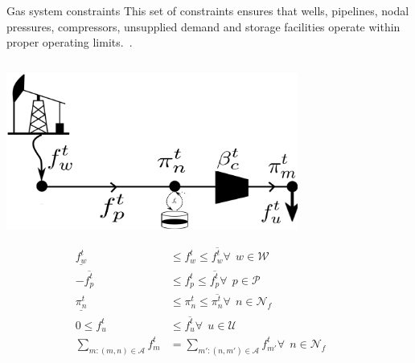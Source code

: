 \documentclass[hyperref={colorlinks,citecolor=blue,linkcolor=blue,urlcolor=blue}]{beamer}
\begin{document}
\begin{frame}{Gas system constraints}
\footnotesize
This set of constraints ensures that wells, pipelines, nodal pressures, compressors, unsupplied demand and storage facilities operate within proper operating limits.~\cite{MPNG}.

\begin{columns}
\begin{column}{0.45\textwidth}
    \includegraphics[width=0.75\textwidth]{figures/gas_dummy.png}

\begin{fleqn}[0pt] %
    \begin{subequations}
    \begin{align}
        \underline{f_{w}^t} & \leq f_{w}^t \leq \overline{f_{w}^t} \forall \ \ w \in \mathcal{W} \label{eq:well_limits} \\
        -\overline{f_{p}^t} & \leq f_{p}^t \leq \overline{f_{p}^t} \forall \ \ p \in \mathcal{P} \label{eq:pipe_limits} \\
        \underline{\pi_{n}^t} & \leq \pi_{n}^t \leq \overline{\pi_{n}^t} \forall \ \ n \in \mathcal{N}_f \label{eq:press_limit} \\
        0 \leq f_{u}^{t} & \leq \overline{f_{u}^{t}} \forall \ \ u \in \mathcal{U} \label{eq:dem_limit_gas} \\
        \sum_{m:(m,n)\in\mathcal{A}} f_{m}^t &= \sum_{m':(n,m')\in\mathcal{A}} f_{m'}^t \forall \ \ n \in \mathcal{N}_f \label{eq:gas_balance}
    \end{align}
    \end{subequations}
    \end{fleqn}
\end{column}

\begin{column}{0.5\textwidth}
\scriptsize  %


\end{column}
\end{columns}
\end{frame}
\end{document}
